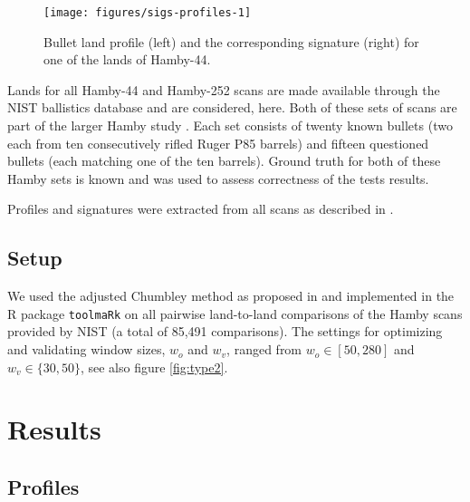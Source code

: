 \documentclass[12pt]{article}
\begin{document}

\begin{figure}

{\centering \texttt{[image: figures/sigs-profiles-1]} 

}

\caption{Bullet land profile (left) and the corresponding signature (right) for one of the lands of Hamby-44.}\label{fig:sigs-profiles}
\end{figure}

Lands for all Hamby-44 and Hamby-252 scans are made available through
the NIST ballistics database \citep{nist} and are considered, here. Both
of these sets of scans are part of the larger Hamby study \citep{hamby}.
Each set consists of twenty known bullets (two each from ten
consecutively rifled Ruger P85 barrels) and fifteen questioned bullets
(each matching one of the ten barrels). Ground truth for both of these
Hamby sets is known and was used to assess correctness of the tests
results.


Profiles and signatures were extracted from all scans as described in
\citet{aoas}.

\subsection{Setup}\label{setup}



We used the adjusted Chumbley method as proposed in \citet{hadler} and
implemented in the R package \texttt{toolmaRk} \citep{toolmark} on all
pairwise land-to-land comparisons of the Hamby scans provided by NIST (a
total of 85,491 comparisons). The settings for optimizing and validating
window sizes, \(w_o\) and \(w_v\), ranged from \(w_o \in [50, 280]\) and
\(w_v \in \{30, 50\}\), see also figure \ref{fig:type2}.

\section{Results}\label{results}

\subsection{Profiles}\label{profiles}
\end{document}
